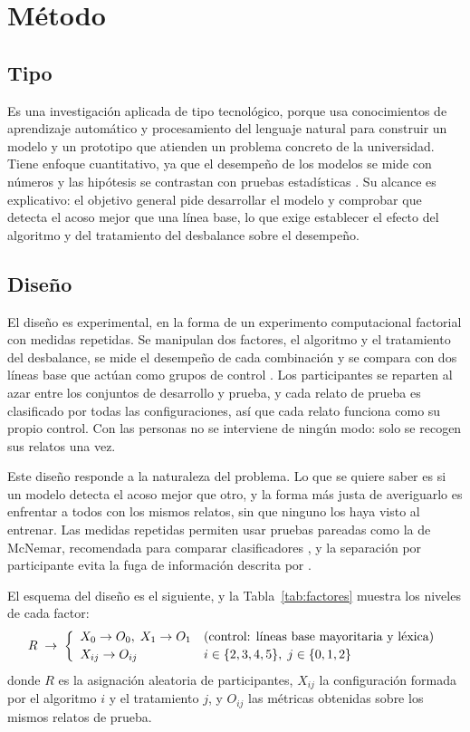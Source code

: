 \section{Método}

\subsection{Tipo}
Es una investigación aplicada de tipo tecnológico, porque usa conocimientos de aprendizaje automático y procesamiento del lenguaje natural para construir un modelo y un prototipo que atienden un problema concreto de la universidad. Tiene enfoque cuantitativo, ya que el desempeño de los modelos se mide con números y las hipótesis se contrastan con pruebas estadísticas \citep{sampieri}. Su alcance es explicativo: el objetivo general pide desarrollar el modelo y comprobar que detecta el acoso mejor que una línea base, lo que exige establecer el efecto del algoritmo y del tratamiento del desbalance sobre el desempeño.

\subsection{Diseño}
El diseño es experimental, en la forma de un experimento computacional factorial con medidas repetidas. Se manipulan dos factores, el algoritmo y el tratamiento del desbalance, se mide el desempeño de cada combinación y se compara con dos líneas base que actúan como grupos de control \citep{sampieri}. Los participantes se reparten al azar entre los conjuntos de desarrollo y prueba, y cada relato de prueba es clasificado por todas las configuraciones, así que cada relato funciona como su propio control. Con las personas no se interviene de ningún modo: solo se recogen sus relatos una vez.

Este diseño responde a la naturaleza del problema. Lo que se quiere saber es si un modelo detecta el acoso mejor que otro, y la forma más justa de averiguarlo es enfrentar a todos con los mismos relatos, sin que ninguno los haya visto al entrenar. Las medidas repetidas permiten usar pruebas pareadas como la de McNemar, recomendada para comparar clasificadores \citep{dietterich1998}, y la separación por participante evita la fuga de información descrita por \citet{kapoor2023}.

El esquema del diseño es el siguiente, y la Tabla~\ref{tab:factores} muestra los niveles de cada factor:
\begin{equation}
\ecuacion{Esquema del diseño experimental}
R \;\rightarrow\; \left\{
\begin{array}{ll}
X_{0} \rightarrow O_{0},\; X_{1} \rightarrow O_{1} & \text{(control: líneas base mayoritaria y léxica)}\\[2pt]
X_{ij} \rightarrow O_{ij} & i \in \{2,3,4,5\},\; j \in \{0,1,2\}
\end{array}\right.
\label{eq:diseno}
\end{equation}
donde $R$ es la asignación aleatoria de participantes, $X_{ij}$ la configuración formada por el algoritmo $i$ y el tratamiento $j$, y $O_{ij}$ las métricas obtenidas sobre los mismos relatos de prueba.


